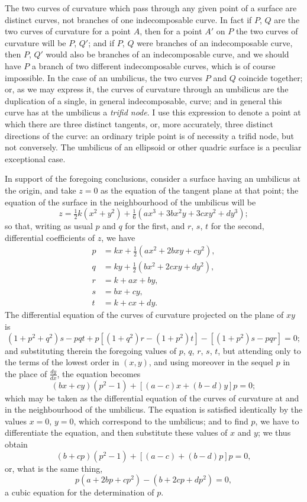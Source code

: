 \documentclass[11pt,a4paper]{article}
\begin{document}
\noindent The two curves of curvature which pass through any given point of a surface are distinct curves, not branches of one indecomposable curve. In fact if $P$, $Q$ are the two curves of curvature for a point $A$, then for a point $A'$ on $P$ the two curves of curvature will be $P$, $Q'$; and if $P$, $Q$ were branches of an indecomposable curve, then $P$, $Q'$ would also be branches of an indecomposable curve, and we should have $P$ a branch of two different indecomposable curves, which is of course impossible. In the case of an umbilicus, the two curves $P$ and $Q$ coincide together; or, as we may express it, the curves of curvature through an umbilicus are the duplication of a single, in general indecomposable, curve; and in general this curve has at the umbilicus a \emph{trifid node}. I use this expression to denote a point at which there are three distinct tangents, or, more accurately, three distinct directions of the curve: an ordinary triple point is of necessity a trifid node, but not conversely. The umbilicus of an ellipsoid or other quadric surface is a peculiar exceptional case.

In support of the foregoing conclusions, consider a surface having an umbilicus at the origin, and take $z=0$ as the equation of the tangent plane at that point; the equation of the surface in the neighbourhood of the umbilicus will be
\[
z = \tfrac{1}{2}k(x^2+y^2) + \tfrac{1}{6}(ax^3 + 3bx^2y + 3cxy^2 + dy^3);
\]
so that, writing as usual $p$ and $q$ for the first, and $r$, $s$, $t$ for the second, differential coefficients of $z$, we have
\begin{align*}
p &= kx + \tfrac{1}{2}(ax^2 + 2bxy + cy^2), \\
q &= ky + \tfrac{1}{2}(bx^2 + 2cxy + dy^2), \\
r &= k + ax + by, \\
s &= bx + cy, \\
t &= k + cx + dy.
\end{align*}
The differential equation of the curves of curvature projected on the plane of $xy$ is
\[
(1+p^2+q^2)s - pqt + p[(1+q^2)r - (1+p^2)t] - [(1+p^2)s - pqr] = 0;
\]
and substituting therein the foregoing values of $p$, $q$, $r$, $s$, $t$, but attending only to the terms of the lowest order in $(x,y)$, and using moreover in the sequel $p$ in the place of $\frac{dy}{dx}$, the equation becomes
\[
(bx+cy)(p^2-1) + [(a-c)x + (b-d)y]p = 0;
\]
which may be taken as the differential equation of the curves of curvature at and in the neighbourhood of the umbilicus. The equation is satisfied identically by the values $x=0$, $y=0$, which correspond to the umbilicus; and to find $p$, we have to differentiate the equation, and then substitute these values of $x$ and $y$; we thus obtain
\[
(b+cp)(p^2-1) + [(a-c) + (b-d)p]p = 0,
\]
or, what is the same thing,
\[
p(a + 2bp + cp^2) - (b + 2cp + dp^2) = 0,
\]
a cubic equation for the determination of $p$.
\end{document}
